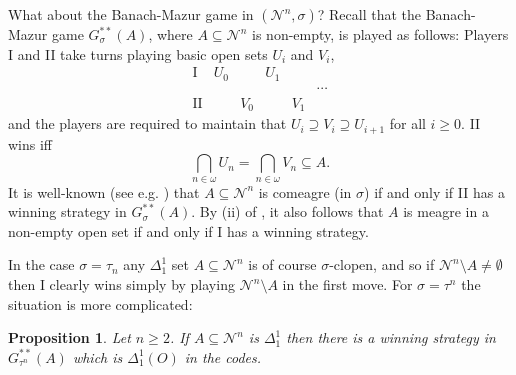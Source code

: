 \documentclass[11pt, english]{article}
\newtheorem{prop}{Proposition}
\newcommand{\baire}{\mathscr N}
\begin{document}
What about the Banach-Mazur game in $(\baire^n,\sigma)$? Recall
that the Banach-Mazur game $G^{**}_{\sigma}(A)$, where
$A\subseteq\baire^n$ is non-empty, is played as follows: Players I
and II take turns playing basic open sets $U_i$ and $V_i$,
$$
\begin{array}{rlllll}
\mathrm{I} & U_0 & \   & U_1\\
  &          &     &          &      & \cdots\\
\mathrm{II} & \       & V_0 &\         &  V_1
\end{array}
$$
and the players are required to maintain that $U_i\supseteq
V_i\supseteq U_{i+1}$ for all $i\geq 0$. II wins iff
$$
\bigcap_{n\in\omega} U_n=\bigcap_{n\in\omega} V_n\subseteq A.
$$
It is well-known (see e.g. \cite[8.33]{kechris95}) that
$A\subseteq \baire^n$ is comeagre (in $\sigma$) if and only if II
has a winning strategy in $G_\sigma^{**}(A)$. By (ii) of
\cite[8.33]{kechris95}, it also follows that $A$ is meagre in a
non-empty open set if and only if I has a winning strategy.

In the case $\sigma=\tau_n$ any $\Delta^1_1$ set
$A\subseteq\baire^n$ is of course $\sigma$-clopen, and so if
$\baire^n\setminus A\neq\emptyset$ then I clearly wins simply by
playing $\baire^n\setminus A$ in the first move. For
$\sigma=\tau^n$ the situation is more complicated:

\begin{prop}\label{propA3}
Let $n\geq 2$. If $A\subseteq \baire^n$ is $\Delta^1_1$ then there
is a winning strategy in $G^{**}_{\tau^n}(A)$ which is
$\Delta^1_1(O)$ in the codes.
\end{prop}
\end{document}
